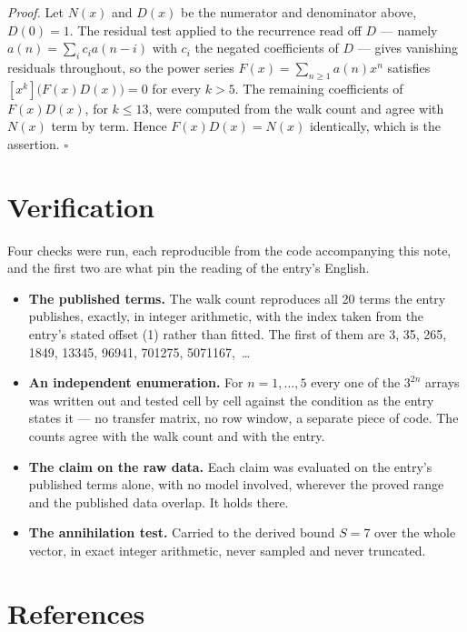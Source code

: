 \documentclass[11pt]{article}
\theoremstyle{definition}
\begin{document}
{\itshape Proof.} Let $N(x)$ and $D(x)$ be the numerator and denominator above, $D(0)=1$. The residual test applied to the recurrence read off $D$ --- namely $a(n) = \sum_i c_i a(n-i)$ with $c_i$ the negated coefficients of $D$ --- gives vanishing residuals throughout, so the power series $F(x)=\sum_{n\ge 1}a(n)x^n$ satisfies $[x^k]\bigl(F(x)D(x)\bigr) = 0$ for every $k > 5$. The remaining coefficients of $F(x)D(x)$, for $k \le 13$, were computed from the walk count and agree with $N(x)$ term by term. Hence $F(x)D(x) = N(x)$ identically, which is the assertion. $\square$

\section{Verification}

Four checks were run, each reproducible from the code accompanying this note, and the first two are what pin the reading of the entry's English.

\begin{itemize}

\item {\bfseries The published terms.} The walk count reproduces all 20 terms the entry publishes, exactly, in integer arithmetic, with the index taken from the entry's stated offset (1) rather than fitted. The first of them are 3, 35, 265, 1849, 13345, 96941, 701275, 5071167,~\dots

\item {\bfseries An independent enumeration.} For $n = 1,\dots,5$ every one of the $3^{2n}$ arrays was written out and tested cell by cell against the condition as the entry states it --- no transfer matrix, no row window, a separate piece of code. The counts agree with the walk count and with the entry.

\item {\bfseries The claim on the raw data.} Each claim was evaluated on the entry's published terms alone, with no model involved, wherever the proved range and the published data overlap. It holds there.

\item {\bfseries The annihilation test.} Carried to the derived bound $S = 7$ over the whole vector, in exact integer arithmetic, never sampled and never truncated.

\end{itemize}

\section{References}
\end{document}
